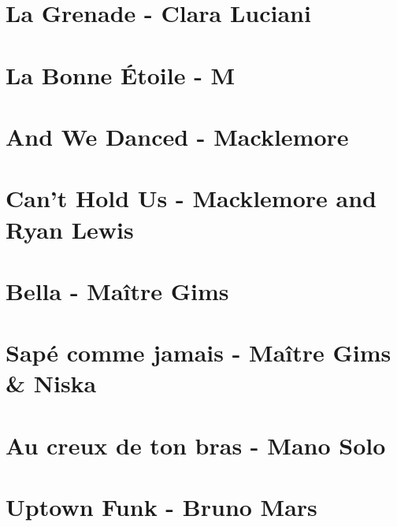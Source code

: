 \documentclass[11pt]{article}
\begin{document}
\section{La Grenade - Clara Luciani}
\begin{guitar}

\end{guitar}

\section{La Bonne Étoile - M}
\begin{guitar}

\end{guitar}

\section{And We Danced - Macklemore}
\begin{guitar}

\end{guitar}

\section{Can't Hold Us - Macklemore and Ryan Lewis}
\begin{guitar}

\end{guitar}

\section{Bella - Maître Gims}
\begin{guitar}

\end{guitar}

\section{Sapé comme jamais - Maître Gims \& Niska}



\section{Au creux de ton bras - Mano Solo}
\begin{guitar}

\end{guitar}

\section{Uptown Funk - Bruno Mars}

\end{document}
